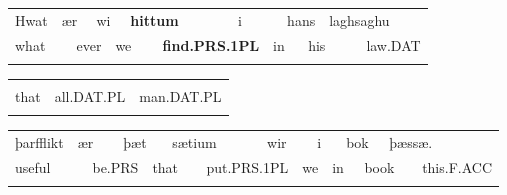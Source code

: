 \begin{tabular}{llllllllllllll}
\lsptoprule
Hwat & \multicolumn{2}{l}{ær

} & \multicolumn{2}{l}{wi

} & \multicolumn{2}{l}{{\bfseries hittum}

} & \multicolumn{2}{l}{i

} & \multicolumn{2}{l}{hans

} & \multicolumn{2}{l}{laghsaghu

} & \\
\multicolumn{2}{l}{what

} & \multicolumn{2}{l}{ever

} & \multicolumn{2}{l}{we

} & \multicolumn{2}{l}{{\bfseries find.PRS.1PL}

} & \multicolumn{2}{l}{in

} & \multicolumn{2}{l}{his

} & \multicolumn{2}{l}{law.DAT

}\\
\lspbottomrule
\end{tabular}

\begin{tabular}{lll}
\lsptoprule
\multicolumn{3}{l}{ær

}\\
that & all.DAT.PL & man.DAT.PL\\
\lspbottomrule
\end{tabular}

\begin{tabular}{llllllllllllllll}
\lsptoprule
þarfflikt & \multicolumn{2}{l}{ær

} & \multicolumn{2}{l}{þæt

} & \multicolumn{2}{l}{sætium

} & \multicolumn{2}{l}{wir

} & \multicolumn{2}{l}{i

} & \multicolumn{2}{l}{bok

} & \multicolumn{2}{l}{þæssæ.

} & \\
\multicolumn{2}{l}{useful

} & \multicolumn{2}{l}{be.PRS

} & \multicolumn{2}{l}{that

} & \multicolumn{2}{l}{put.PRS.1PL

} & \multicolumn{2}{l}{we

} & \multicolumn{2}{l}{in

} & \multicolumn{2}{l}{book

} & \multicolumn{2}{l}{this.F.ACC

}\\
\lspbottomrule
\end{tabular}

